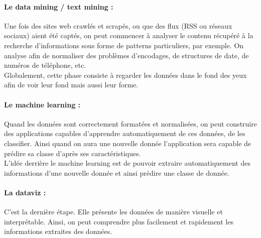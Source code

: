             \color{red}

            \paragraph{Le data mining / text mining :}
                Une fois des sites web crawlés et scrapés, ou que des flux (RSS ou réseaux sociaux) aient été captés, on peut commencer à analyser le contenu récupéré à la recherche d'informations sous forme de patterns particuliers, par exemple. On analyse afin de normaliser des problèmes d'encodages, de structures de date, de numéros de téléphone, etc.\\
                Globalement, cette phase consiste à regarder les données \og dans le fond des yeux \fg \autocite{steph_canu} afin de voir leur fond mais aussi leur forme.

            \paragraph{Le machine learning :}
                Quand les données sont correctement formatées et normalisées, on peut construire des applications capables d'apprendre automatiquement de ces données, de les classifier. Ainsi quand on aura une nouvelle donnée l'application sera capable de prédire sa classe d'après ses caractéristiques.\\
                L'idée derrière le machine learning est de pouvoir extraire automatiquement des informations d'une nouvelle donnée et ainsi prédire une classe de donnée.

            \paragraph{La dataviz :}
                C'est la dernière étape. Elle présente les données de manière visuelle et interprétable. Ainsi, on peut comprendre plus facilement et rapidement les informations extraites des données.


